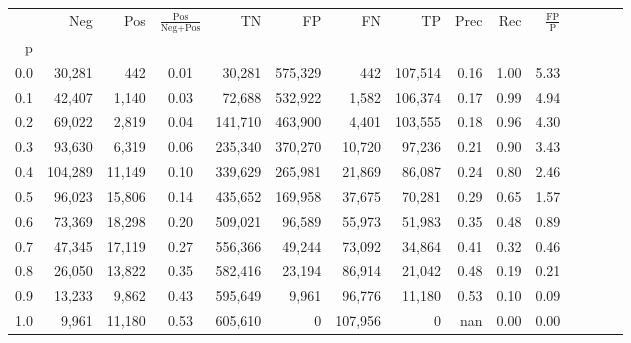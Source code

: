 \begin{tabular}{rrrcrrrrrrrrrrr}
\toprule
{} &      Neg &     Pos & $\frac{\text{Pos}}{\text{Neg}+\text{Pos}}$ &       TN &       FP &       FN &       TP &  Prec &   Rec & $\frac{\text{FP}}{\text{P}}$ \\
p   &          &         &                                            &          &          &          &          &       &       &                              \\
\midrule
0.0 &   30,281 &     442 &                                       0.01 &   30,281 &  575,329 &      442 &  107,514 &  0.16 &  1.00 &                         5.33 \\
0.1 &   42,407 &   1,140 &                                       0.03 &   72,688 &  532,922 &    1,582 &  106,374 &  0.17 &  0.99 &                         4.94 \\
0.2 &   69,022 &   2,819 &                                       0.04 &  141,710 &  463,900 &    4,401 &  103,555 &  0.18 &  0.96 &                         4.30 \\
0.3 &   93,630 &   6,319 &                                       0.06 &  235,340 &  370,270 &   10,720 &   97,236 &  0.21 &  0.90 &                         3.43 \\
0.4 &  104,289 &  11,149 &                                       0.10 &  339,629 &  265,981 &   21,869 &   86,087 &  0.24 &  0.80 &                         2.46 \\
0.5 &   96,023 &  15,806 &                                       0.14 &  435,652 &  169,958 &   37,675 &   70,281 &  0.29 &  0.65 &                         1.57 \\
0.6 &   73,369 &  18,298 &                                       0.20 &  509,021 &   96,589 &   55,973 &   51,983 &  0.35 &  0.48 &                         0.89 \\
0.7 &   47,345 &  17,119 &                                       0.27 &  556,366 &   49,244 &   73,092 &   34,864 &  0.41 &  0.32 &                         0.46 \\
0.8 &   26,050 &  13,822 &                                       0.35 &  582,416 &   23,194 &   86,914 &   21,042 &  0.48 &  0.19 &                         0.21 \\
0.9 &   13,233 &   9,862 &                                       0.43 &  595,649 &    9,961 &   96,776 &   11,180 &  0.53 &  0.10 &                         0.09 \\
1.0 &    9,961 &  11,180 &                                       0.53 &  605,610 &        0 &  107,956 &        0 &   nan &  0.00 &                         0.00 \\
\bottomrule
\end{tabular}
